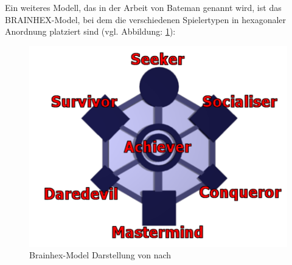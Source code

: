 Ein weiteres Modell, das in der Arbeit von Bateman genannt wird, ist das BRAINHEX-Model, bei dem die verschiedenen Spielertypen in hexagonaler Anordnung platziert sind (vgl. Abbildung: \ref{fig:brain-hex}):

\begin{figure}[ht]
\centering
\includegraphics[width=1\linewidth]{content/pictures/brainhex-classes.png}
\caption{Brainhex-Model Darstellung von \cite{noauthor_i_nodate} nach \cite{nacke_brainhex_2013}}
\label{fig:brain-hex}
\end{figure}





